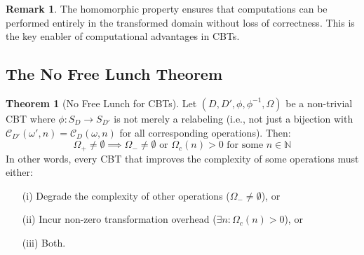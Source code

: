 \documentclass[11pt]{article}
\theoremstyle{definition}
\newtheorem{theorem}{Theorem}
\newtheorem{remark}{Remark}
\begin{document}
\begin{remark}
The homomorphic property ensures that computations can be performed entirely in the transformed domain without loss of correctness. This is the key enabler of computational advantages in CBTs.
\end{remark}

\subsection{The No Free Lunch Theorem}
\label{sec:nfl}

\begin{theorem}[No Free Lunch for CBTs]
\label{thm:nfl}
Let $(D, D', \phi, \phi^{-1}, \Omega)$ be a non-trivial CBT where $\phi: S_D \to S_{D'}$ is not merely a relabeling (i.e., not just a bijection with $\mathcal{C}_{D'}(\omega', n) = \mathcal{C}_D(\omega, n)$ for all corresponding operations). Then:
\begin{equation}
\Omega_+ \neq \emptyset \implies \Omega_- \neq \emptyset \text{ or } \Omega_c(n) > 0 \text{ for some } n \in \mathbb{N}
\end{equation}
In other words, every CBT that improves the complexity of some operations must either:
\begin{enumerate}
\item[(i)] Degrade the complexity of other operations ($\Omega_- \neq \emptyset$), or
\item[(ii)] Incur non-zero transformation overhead ($\exists n: \Omega_c(n) > 0$), or
\item[(iii)] Both.
\end{enumerate}
\end{theorem}
\end{document}
